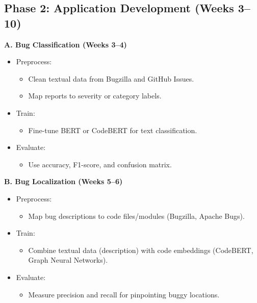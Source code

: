 \documentclass[12pt]{article}
\begin{document}
\subsection*{Phase 2: Application Development (Weeks 3--10)}
\textbf{A. Bug Classification (Weeks 3--4)}
\begin{itemize}
    \item Preprocess:
    \begin{itemize}
        \item Clean textual data from Bugzilla and GitHub Issues.
        \item Map reports to severity or category labels.
    \end{itemize}
    \item Train:
    \begin{itemize}
        \item Fine-tune BERT or CodeBERT for text classification.
    \end{itemize}
    \item Evaluate:
    \begin{itemize}
        \item Use accuracy, F1-score, and confusion matrix.
    \end{itemize}
\end{itemize}

\textbf{B. Bug Localization (Weeks 5--6)}
\begin{itemize}
    \item Preprocess:
    \begin{itemize}
        \item Map bug descriptions to code files/modules (Bugzilla, Apache Bugs).
    \end{itemize}
    \item Train:
    \begin{itemize}
        \item Combine textual data (description) with code embeddings (CodeBERT, Graph Neural Networks).
    \end{itemize}
    \item Evaluate:
    \begin{itemize}
        \item Measure precision and recall for pinpointing buggy locations.
    \end{itemize}
\end{itemize}
\end{document}
